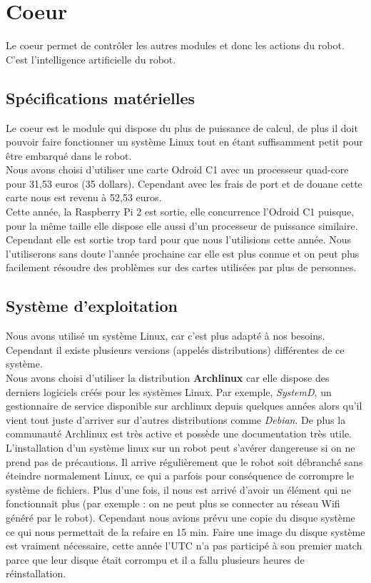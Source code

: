 \chapter{Coeur}

	Le coeur permet de contrôler les autres modules et donc les actions du robot. C'est l'intelligence artificielle du robot.


	\section{Spécifications matérielles}
	Le coeur est le module qui dispose du plus de puissance de calcul, de plus il doit pouvoir faire fonctionner un système Linux tout en étant suffisamment petit pour être embarqué dans le robot.\\

	Nous avons choisi d'utiliser une carte Odroid C1 avec un processeur quad-core pour 31,53 euros (35 dollars). Cependant avec les frais de port et de douane cette carte nous est revenu à 52,53 euros.\\

	Cette année, la Raspberry Pi 2 est sortie, elle concurrence l'Odroid C1 puisque, pour la même taille elle dispose elle aussi d'un processeur de puissance similaire. Cependant elle est sortie trop tard pour que nous l'utilisions cette année. Nous l'utiliserons sans doute l'année prochaine car elle est plus connue et on peut plus facilement résoudre des problèmes sur des cartes utilisées par plus de personnes.

	\section{Système d'exploitation}
	Nous avons utilisé un système Linux, car c'est plus adapté à nos besoins. Cependant il existe plusieurs versions (appelés distributions) différentes de ce système.\\

	Nous avons choisi d'utiliser la distribution \textbf{Archlinux} car elle dispose des derniers logiciels créés pour les systèmes Linux. Par exemple, \textit{SystemD}, un gestionnaire de service disponible sur archlinux depuis quelques années alors qu'il vient tout juste d'arriver sur d'autres distributions comme \textit{Debian}. De plus la communauté Archlinux est très active et possède une documentation très utile.\\

	L'installation d'un système linux sur un robot peut s'avérer dangereuse si on ne prend pas de précautions. Il arrive régulièrement que le robot soit débranché sans éteindre normalement Linux, ce qui a parfois pour conséquence de corrompre le système de fichiers. Plus d'une fois, il nous est arrivé d'avoir un élément qui ne fonctionnait plus (par exemple : on ne peut plus se connecter au réseau Wifi généré par le robot). Cependant nous avions prévu une copie du disque système ce qui nous permettait de la refaire en 15 min. Faire une image du disque système est vraiment nécessaire, cette année l'UTC n'a pas participé à son premier match parce que leur disque était corrompu et il a fallu plusieurs heures de réinstallation.\\

